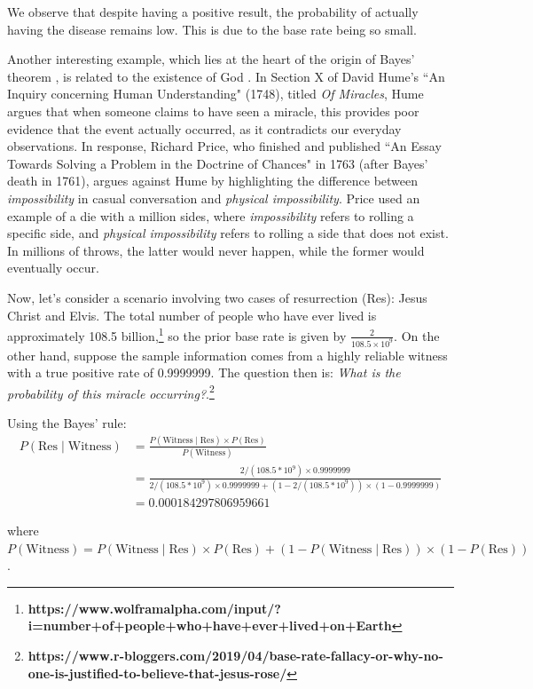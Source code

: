 We observe that despite having a positive result, the probability of actually having the disease remains low. This is due to the base rate being so small.

Another interesting example, which lies at the heart of the origin of Bayes' theorem \cite{bayes1763lii}, is related to the existence of God \cite{stigler2018richard}. In Section X of David Hume's ``An Inquiry concerning Human Understanding" (1748), titled \textit{Of Miracles}, Hume argues that when someone claims to have seen a miracle, this provides poor evidence that the event actually occurred, as it contradicts our everyday observations. In response, Richard Price, who finished and published ``An Essay Towards Solving a Problem in the Doctrine of Chances" in 1763 (after Bayes' death in 1761), argues against Hume by highlighting the difference between \textit{impossibility} in casual conversation and \textit{physical impossibility}. Price used an example of a die with a million sides, where \textit{impossibility} refers to rolling a specific side, and \textit{physical impossibility} refers to rolling a side that does not exist. In millions of throws, the latter would never happen, while the former would eventually occur.

Now, let's consider a scenario involving two cases of resurrection (Res): Jesus Christ and Elvis. The total number of people who have ever lived is approximately 108.5 billion,\footnote{\textbf{https://www.wolframalpha.com/input/?i=number+of+people+who+have+ever+lived+on+Earth}} so the prior base rate is given by \( \frac{2}{108.5 \times 10^9} \). On the other hand, suppose the sample information comes from a highly reliable witness with a true positive rate of 0.9999999. The question then is: \textit{What is the probability of this miracle occurring?}.\footnote{\textbf{https://www.r-bloggers.com/2019/04/base-rate-fallacy-or-why-no-one-is-justified-to-believe-that-jesus-rose/}}

Using the Bayes' rule:
{\small{
\begin{align*}
	P(\text{Res}\mid \text{Witness}) & =  \frac{P(\text{Witness}\mid \text{Res})\times P(\text{Res})}{P(\text{Witness})}\\
	& =\frac{2/(108.5 * 10^9) \times 0.9999999}{2/(108.5 * 10^9) \times 0.9999999 + (1-2/(108.5 * 10^9)) \times (1-0.9999999)}\\
	& = 0.000184297806959661
\end{align*}
}}

where $P(\text{Witness})=P(\text{Witness}\mid \text{Res})\times P(\text{Res})+(1-P(\text{Witness}\mid \text{Res}))\times (1-P(\text{Res}))$.

